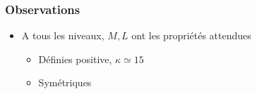 \begin{frame}
\frametitle{Observations}
\begin{itemize}
  \item A tous les niveaux, $M,L$ ont les propriétés attendues
    \begin{itemize}
      \item Définies positive, $\kappa \simeq 15$
      \item Symétriques
    \end{itemize}
\end{itemize}


\end{frame}
